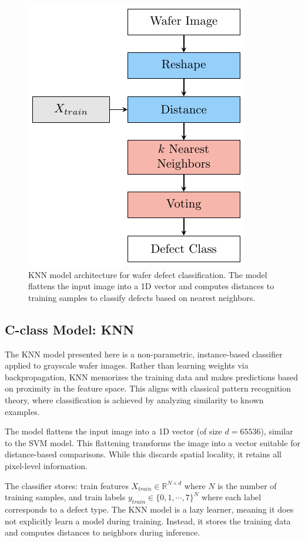 \documentclass[conference]{IEEEtran}
\begin{document}
\begin{figure}[t]
    \centering
    \includegraphics[width=0.7\linewidth]{assets/knn-model.pdf}
    \caption{KNN model architecture for wafer defect classification. The model flattens the input image into a 1D vector and computes distances to training samples to classify defects based on nearest neighbors.}
    \label{fig:knn-model}
\end{figure}

\subsection{C-class Model: KNN}
The KNN model presented here is a non-parametric, instance-based classifier applied to grayscale wafer images. 
Rather than learning weights via backpropagation, KNN memorizes the training data and makes predictions based on proximity in the feature space. 
This aligns with classical pattern recognition theory, where classification is achieved by analyzing similarity to known examples.

The model flattens the input image into a 1D vector (of size $d=65536$), similar to the SVM model.
This flattening transforms the image into a vector suitable for distance-based comparisons. 
While this discards spatial locality, it retains all pixel-level information.

The classifier stores: train features \( X_{train}\in \mathbb{R}^{N\times d} \) where $N$ is the number of training samples, 
and train labels \( y_{train}\in \{0, 1, \cdots, 7 \}^{N} \) where each label corresponds to a defect type.
The KNN model is a lazy learner, meaning it does not explicitly learn a model during training.
Instead, it stores the training data and computes distances to neighbors during inference.
\end{document}
